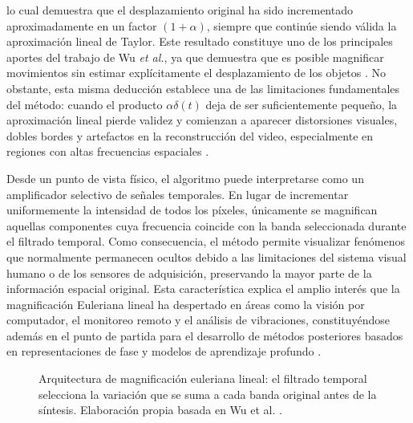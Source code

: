 lo cual demuestra que el desplazamiento original ha sido incrementado aproximadamente en un factor $(1+\alpha)$, siempre que continúe siendo válida la aproximación lineal de Taylor. Este resultado constituye uno de los principales aportes del trabajo de Wu \textit{et al.}, ya que demuestra que es posible magnificar movimientos sin estimar explícitamente el desplazamiento de los objetos \cite{wu2012eulerian}. No obstante, esta misma deducción establece una de las limitaciones fundamentales del método: cuando el producto $\alpha\delta(t)$ deja de ser suficientemente pequeño, la aproximación lineal pierde validez y comienzan a aparecer distorsiones visuales, dobles bordes y artefactos en la reconstrucción del video, especialmente en regiones con altas frecuencias espaciales \cite{ahmed2023overview}.

Desde un punto de vista físico, el algoritmo puede interpretarse como un amplificador selectivo de señales temporales. En lugar de incrementar uniformemente la intensidad de todos los píxeles, únicamente se magnifican aquellas componentes cuya frecuencia coincide con la banda seleccionada durante el filtrado temporal. Como consecuencia, el método permite visualizar fenómenos que normalmente permanecen ocultos debido a las limitaciones del sistema visual humano o de los sensores de adquisición, preservando la mayor parte de la información espacial original. Esta característica explica el amplio interés que la magnificación Euleriana lineal ha despertado en áreas como la visión por computador, el monitoreo remoto y el análisis de vibraciones, constituyéndose además en el punto de partida para el desarrollo de métodos posteriores basados en representaciones de fase y modelos de aprendizaje profundo \cite{ahmed2023overview}.
\begin{figure}[htbp]
\centering
{}
\caption[Arquitectura de magnificación euleriana lineal]{Arquitectura de magnificación euleriana lineal: el filtrado temporal selecciona la variación que se suma a cada banda original antes de la síntesis. Elaboración propia basada en Wu et al. \cite{wu2012eulerian}.}
\label{fig:evm_pipeline}
\end{figure}

